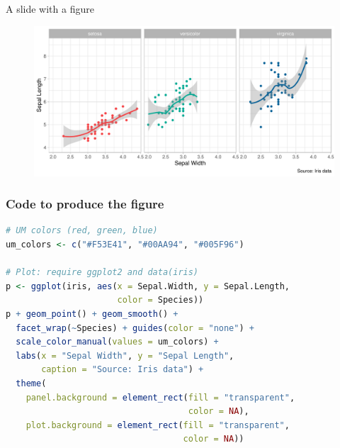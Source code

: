 \documentclass[12pt]{beamer}
\begin{document}
\begin{frame}{A slide with a figure}

\begin{figure}
\includegraphics[width = \linewidth]{figures/iris}
\end{figure}

\end{frame}

\begin{frame}[fragile]\frametitle{Code to produce the figure}

\begin{lstlisting}[language=R]
# UM colors (red, green, blue)
um_colors <- c("#F53E41", "#00AA94", "#005F96")

# Plot: require ggplot2 and data(iris)
p <- ggplot(iris, aes(x = Sepal.Width, y = Sepal.Length, 
                      color = Species))
p + geom_point() + geom_smooth() + 
  facet_wrap(~Species) + guides(color = "none") + 
  scale_color_manual(values = um_colors) + 
  labs(x = "Sepal Width", y = "Sepal Length", 
       caption = "Source: Iris data") + 
  theme(
    panel.background = element_rect(fill = "transparent", 
                                    color = NA),
    plot.background = element_rect(fill = "transparent", 
                                   color = NA))
\end{lstlisting}

\end{frame}
\end{document}
